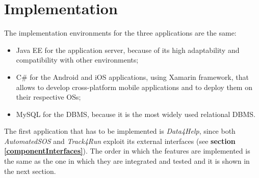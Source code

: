 \section{Implementation}
The implementation environments for the three applications are the same:
\begin{itemize}
    \item Java EE for the application server, because of its high adaptability and compatibility with other environments;
    \item C$\#$ for the Android and iOS applications, using Xamarin framework, that allows to develop cross-platform mobile applications and to deploy them on their respective OSs;
    \item MySQL for the DBMS, because it is the most widely used relational DBMS.
\end{itemize}

The first application that has to be implemented is \emph{Data4Help}, since both \emph{AutomatedSOS} and \emph{Track4Run} exploit its external interfaces (see \textbf{section \ref{componentInterfaces}}). The order in which the features are implemented is the same as the one in which they are integrated and tested and it is shown in the next section.
